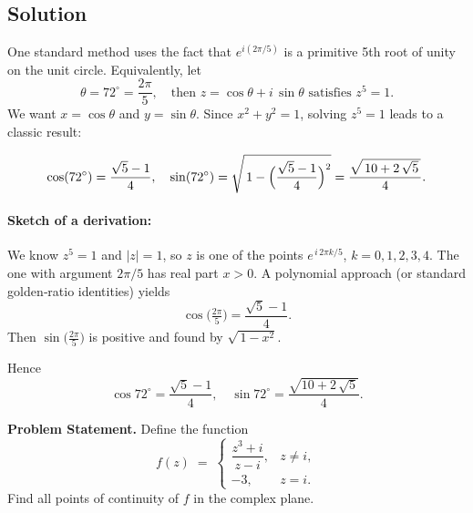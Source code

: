 \documentclass[12pt]{article}
\theoremstyle{definition} %
\theoremstyle{plain} %
\begin{document}
\subsection*{Solution}

One standard method uses the fact that $e^{i(2\pi/5)}$ is a primitive 5th root of unity on the unit circle.  Equivalently, let 
\[
\theta = 72^\circ = \frac{2\pi}{5}, 
\quad
\text{then }
z = \cos \theta + i\,\sin\theta
\text{ satisfies } z^5 = 1.
\]
We want $x = \cos\theta$ and $y = \sin\theta$.  Since $x^2 + y^2=1$, solving $z^5=1$ leads to a classic result:

\[
\cos(72^\circ) 
= \frac{\sqrt{5} - 1}{4},
\quad
\sin(72^\circ)
= \sqrt{\,1 - \Bigl(\frac{\sqrt{5} - 1}{4}\Bigr)^2}
= \frac{\sqrt{\,10 + 2\,\sqrt{5}\,}}{4}.
\]

\paragraph{Sketch of a derivation:}
We know $z^5=1$ and $|z|=1$, so $z$ is one of the points $e^{\,i\,2\pi k/5}$, $k=0,1,2,3,4$.  The one with argument $2\pi/5$ has real part $x>0$.  A polynomial approach (or standard golden‐ratio identities) yields
\[
\cos\!\bigl(\tfrac{2\pi}{5}\bigr) 
= \frac{\sqrt{5} - 1}{4}.
\]
Then $\sin\bigl(\tfrac{2\pi}{5}\bigr)$ is positive and found by $\sqrt{\,1 - x^2}$.  

Hence
\[
\boxed{
\cos 72^\circ = \frac{\sqrt{5} - 1}{4},
\quad
\sin 72^\circ = \frac{\sqrt{10 + 2\,\sqrt{5}}}{4}.
}
\]

\noindent
\textbf{Problem Statement.}
Define the function
\[
f(z) \;=\;
\begin{cases}
\dfrac{z^{3} + i}{\,z - i\,}, & z \neq i, \\[6pt]
-3, & z = i.
\end{cases}
\]
Find all points of continuity of \(f\) in the complex plane.

\medskip
\end{document}
